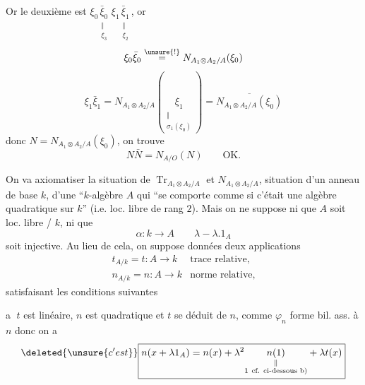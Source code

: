Or le deuxième est $\xi_0\underset{\substack{\Vert\\\xi_3}}{\bar\xi_0}\,\xi_1\underset{\substack{\Vert\\\xi_2}}{\bar\xi_1}$, or
\[
 \xi_0\bar\xi_0\overset{\unsure{!}}{=}N_{A_1\otimes A_2/A}(\xi_0)
\]
\[
 \xi_1\bar\xi_1=N_{A_1\otimes A_2/A}\left(\underset{\substack{\Vert\\\sigma_1(\xi_0)}}{\xi_1}\right)
 =\overline{N_{A_1\otimes A_2/A}(\xi_0)}
\]
donc  $N=N_{A_1\otimes A_2/A}(\xi_0)$, on trouve
\[
 N\bar N=N_{A/O}(N)\qquad\text{OK}.
\]

On va axiomatiser la situation de  $\operatorname{Tr}_{A_1\otimes A_2/A}$ et $N_{A_1\otimes A_2/A}$,  situation d'un anneau de base $k$,  d'une ``$k$-algèbre $A$ qui ``se comporte comme si c'était une algèbre quadratique sur $k$'' (i.e. loc. libre de rang $2$). Mais on ne suppose ni que $A$ soit loc. libre  / $k$, ni que
\[
 \alpha:k\longrightarrow A\qquad\lambda\mathrel{-}\lambda.1_A
\]
soit injective. Au lieu de cela, on suppose données deux applications
\[
 \begin{array}{lll}
 t_{A/k}=t:A\longrightarrow k&\text{trace relative},\\
 n_{A/k}=n:A\longrightarrow k&\text{norme relative},
 \end{array}
\]
satisfaisant les conditions suivantes

\textcircled{a} $t$ est linéaire, $n$ est quadratique et $t$ se déduit de $n$, comme  $\varphi_n$ forme bil. ass. à $n$
donc on a
\[
 \deleted{\unsure{c'est}}\boxed{n(x+\lambda 1_A)=n(x)+\lambda^2\underset{\substack{\Vert\\1\ \text{cf. ci-dessous b)}}}{n(1)}+\lambda t(x)}
\]
